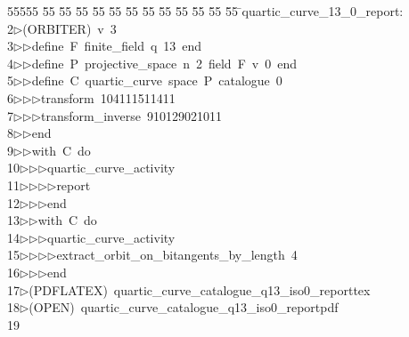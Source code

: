 %
%
\begin{tabbing}
55555 \= 55 \= 55 \= 55 \= 55 \= 55 \= 55 \= 55 \= 55 \= 55 \= 55 \= 55 \= 55 \= \>quartic\_curve\_13\_0\_report:\ \\[0pt]
2\>$\triangleright$\>(ORBITER)\ v\ 3\ \\[0pt]
3\>$\triangleright$\>$\triangleright$\>define\ F\ finite\_field\ q\ 13\ end\ \\[0pt]
4\>$\triangleright$\>$\triangleright$\>define\ P\ projective\_space\ n\ 2\ field\ F\ v\ 0\ end\ \\[0pt]
5\>$\triangleright$\>$\triangleright$\>define\ C\ quartic\_curve\ space\ P\ catalogue\ 0\ \\[0pt]
6\>$\triangleright$\>$\triangleright$\>$\triangleright$\>transform\ 104111511411\ \\[0pt]
7\>$\triangleright$\>$\triangleright$\>$\triangleright$\>transform\_inverse\ 910129021011\ \\[0pt]
8\>$\triangleright$\>$\triangleright$\>end\ \\[0pt]
9\>$\triangleright$\>$\triangleright$\>with\ C\ do\ \\[0pt]
10\>$\triangleright$\>$\triangleright$\>$\triangleright$\>quartic\_curve\_activity\ \\[0pt]
11\>$\triangleright$\>$\triangleright$\>$\triangleright$\>$\triangleright$\>report\ \\[0pt]
12\>$\triangleright$\>$\triangleright$\>$\triangleright$\>end\ \\[0pt]
13\>$\triangleright$\>$\triangleright$\>with\ C\ do\ \\[0pt]
14\>$\triangleright$\>$\triangleright$\>$\triangleright$\>quartic\_curve\_activity\ \\[0pt]
15\>$\triangleright$\>$\triangleright$\>$\triangleright$\>$\triangleright$\>extract\_orbit\_on\_bitangents\_by\_length\ 4\ \\[0pt]
16\>$\triangleright$\>$\triangleright$\>$\triangleright$\>end\\[0pt]
17\>$\triangleright$\>(PDFLATEX)\ quartic\_curve\_catalogue\_q13\_iso0\_reporttex\\[0pt]
18\>$\triangleright$\>(OPEN)\ quartic\_curve\_catalogue\_q13\_iso0\_reportpdf\\[0pt]
19\>\end{tabbing}
